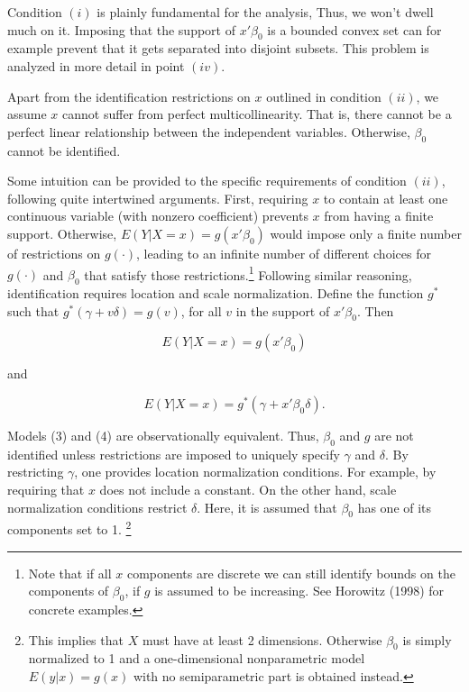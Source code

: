 Condition $(i)$ is plainly fundamental for the analysis, Thus, we won't dwell much on it. Imposing that the support of $x'\beta_0$ is a bounded convex set can for example prevent that it gets separated into disjoint subsets. This problem is analyzed in more detail in point $(iv)$.

Apart from the identification restrictions on $x$ outlined in condition $(ii)$, we assume $x$ cannot suffer from perfect multicollinearity. That is, there cannot be a perfect linear relationship between the independent variables. Otherwise, $\beta_0$ cannot be identified.

Some intuition can be provided to the specific requirements of condition $(ii)$, following quite intertwined arguments. First, requiring $x$ to contain at least one continuous variable (with nonzero coefficient) prevents $x$ from having a finite support. Otherwise, $E(Y|X = x) = g(x'\beta_0)$ would impose only a finite number of restrictions on $g(\cdot)$, leading to an infinite number of different choices for $g(\cdot)$ and $\beta_0$ that satisfy those restrictions.\footnote{Note that if all $x$ components are discrete we can still identify bounds on the components of $\beta_0$, if $g$ is assumed to be increasing. See Horowitz (1998) \cite{[13]} for  concrete examples.} Following similar reasoning, identification requires location and scale normalization. Define the function $g^{*}$ such that $g^{*}(\gamma + v\delta) = g(v)$, for all $v$ in the support of $x'\beta_0$. Then

\begin{equation}
E(Y|X = x) = g(x'\beta_0)
\end{equation}

and

\begin{equation}
E(Y|X = x) = g^*(\gamma + x'\beta_0\delta).
\end{equation}

Models (3) and (4) are observationally equivalent. Thus, $\beta_0$ and $g$ are not identified unless restrictions are imposed to uniquely specify $\gamma$ and $\delta$. By restricting $\gamma$, one provides location normalization conditions. For example, by requiring that $x$ does not include a constant. On the other hand, scale normalization conditions restrict $\delta$. Here, it is assumed that $\beta_0$ has one of its components set to 1. \footnote{This implies that $X$ must have at least 2 dimensions. Otherwise $\beta_0$ is simply normalized to 1 and a one-dimensional nonparametric model $E(y|x) = g(x)$ with no semiparametric part is obtained instead.}

